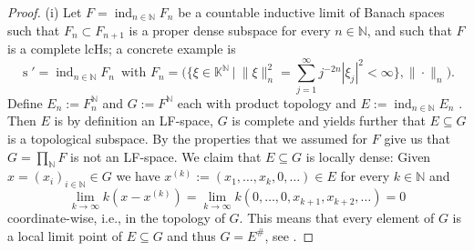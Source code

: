 \documentclass[11pt, a4paper, reqno]{amsart}
\theoremstyle{definition}
\newcommand{\Bigsum}[2]{\ensuremath{\mathop{\textstyle\sum}_{#1}^{#2}}}
\newcommand{\Bigprod}[2]{\ensuremath{\mathop{\textstyle\prod}_{#1}^{#2}}}
\newcommand{\ind}{\operatorname{ind}\nolimits}
\newcommand{\NN}{\mathbb{N}}
\newcommand{\KK}{\mathbb{K}}
\renewcommand{\sharp}{\texttt{\#}}
\begin{document}
\begin{proof} (i) Let $F=\ind_{n\in\NN}F_n$ be a countable inductive limit of Banach spaces such that $F_n\subset F_{n+1}$ is a proper dense subspace for every $n\in\NN$, and such that $F$ is a complete lcHs; a concrete example is 
$$
\operatorname{s}'=\mathop{\ind}_{n\in\NN}F_n\,\text{ with } F_n=\bigl(\bigl\{\xi\in\KK^{\NN}\:\big|\:\|\xi\|_n^2=\Bigsum{j=1}{\infty}j^{-2n}|\xi_j|^2<\infty\bigr\},\|\cdot\|_n\bigr).
$$
Define $E_n:=F_n^{\NN}$ and $G:=F^{\NN}$ each with product topology and $E:=\ind_{n\in\NN}E_n$ . Then $E$ is by definition an LF-space, $G$ is complete and \cite[Prop 8.7.3]{BPC} yields further that $E\subseteq G$ is a topological subspace. By \cite[Prop 8.4.15]{BPC} the properties that we assumed for $F$ give us that $G=\Bigprod{\NN}{}F$ is not an LF-space. We claim that $E\subseteq G$ is locally dense: Given $x=(x_i)_{i\in\NN}\in G$ we have $x^{(k)}:=(x_1,\dots,x_k,0,\dots)\in E$ for every $k\in\NN$ and
$$
\lim_{k\rightarrow\infty}k(x-x^{(k)})=\lim_{k\rightarrow\infty}k(0,\dots,0,x_{k+1},x_{k+2},\dots)=0
$$
coordinate\hspace{1pt}-wise, i.e., in the topology of $G$. This means that every element of $G$ is a local limit point of $E\subseteq G$ and thus $G=E^{\sharp}$, see \cite[Chapter 5]{BPC}.

\medskip


\end{proof}
\end{document}
